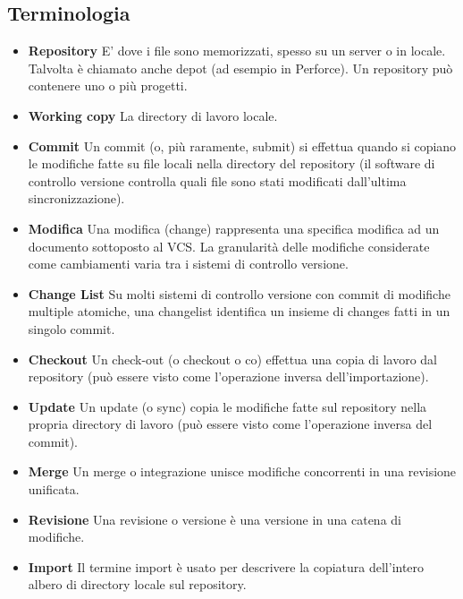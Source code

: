 \subsection{Terminologia}
\begin{itemize}
\item \textbf{Repository} E' dove i file sono memorizzati, spesso su un server o in locale. Talvolta è chiamato anche depot (ad esempio in Perforce). Un repository può contenere uno o più progetti.

\item \textbf{Working copy} La directory di lavoro locale.

\item \textbf{Commit}
Un commit (o, più raramente, submit) si effettua quando si copiano le modifiche fatte su file locali nella directory del repository (il software di controllo versione controlla quali file sono stati modificati dall'ultima sincronizzazione).

\item \textbf{Modifica}
Una modifica (change) rappresenta una specifica modifica ad un documento sottoposto al VCS. La granularità delle modifiche considerate come cambiamenti varia tra i sistemi di controllo versione.

\item \textbf{Change List}
Su molti sistemi di controllo versione con commit di modifiche multiple atomiche, una changelist identifica un insieme di changes fatti in un singolo commit.

\item \textbf{Checkout}
Un check-out (o checkout o co) effettua una copia di lavoro dal repository (può essere visto come l'operazione inversa dell'importazione).

\item \textbf{Update}
Un update (o sync) copia le modifiche fatte sul repository nella propria directory di lavoro (può essere visto come l'operazione inversa del commit).

\item \textbf{Merge}
Un merge o integrazione unisce modifiche concorrenti in una revisione unificata.

\item \textbf{Revisione}
Una revisione o versione è una versione in una catena di modifiche.

\item \textbf{Import}
Il termine import è usato per descrivere la copiatura dell'intero albero di directory locale sul repository.


\end{itemize}
